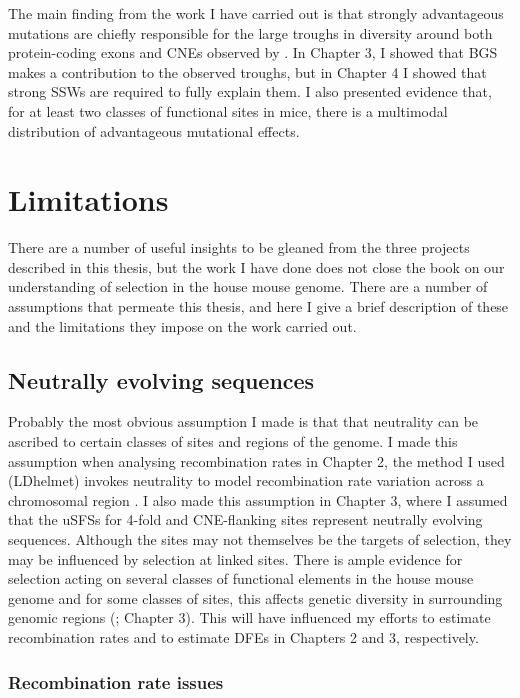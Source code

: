 	The main finding from the work I have carried out is that strongly advantageous mutations are chiefly responsible for the large troughs in diversity around both protein-coding exons and CNEs observed by \cite{RN122}. In Chapter 3, I showed that BGS makes a contribution to the observed troughs, but in Chapter 4 I showed that strong SSWs are required to fully explain them. I also presented evidence that, for at least two classes of functional sites in mice, there is a multimodal distribution of advantageous mutational effects. 
	 
\section{Limitations}

	There are a number of useful insights to be gleaned from the three projects described in this thesis, but the work I have done does not close the book on our understanding of selection in the house mouse genome. There are a number of assumptions that permeate this thesis, and here I give a brief description of these and the limitations they impose on the work carried out.
 
\subsection{Neutrally evolving sequences}

	 Probably the most obvious assumption I made is that that neutrality can be ascribed to certain classes of sites and regions of the genome. I made this assumption when analysing recombination rates in Chapter 2, the method I used (LDhelmet) invokes neutrality to model recombination rate variation across a chromosomal region \citep{RN213}. I also made this assumption in Chapter 3, where I assumed that the uSFSs for 4-fold and CNE-flanking sites represent neutrally evolving sequences. Although the sites may not themselves be the targets of selection, they may be influenced by selection at linked sites. There is ample evidence for selection acting on several classes of functional elements in the house mouse genome \citep{RN342, RN170} and for some classes of sites, this affects genetic diversity in surrounding genomic regions (\citealt{RN122}; Chapter 3). This will have influenced my efforts to estimate recombination rates and to estimate DFEs in Chapters 2 and 3, respectively.

\subsubsection{Recombination rate issues}

